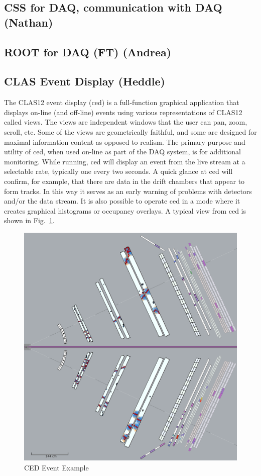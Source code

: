 \subsection{CSS for DAQ, communication with DAQ (Nathan)}



\subsection{ROOT for DAQ (FT) (Andrea)}




\subsection{CLAS Event Display (Heddle)}

The CLAS12 event display (ced) is a full-function graphical application that displays on-line (and off-line) events using various representations of CLAS12 called views. The views are independent windows that the user can pan, zoom, scroll, etc. Some of the views are geometrically faithful, and some are designed for maximal information content as opposed to realism. The primary purpose and utility of ced, when used on-line as part of the DAQ system, is for additional monitoring. While running, ced will display an event from the live stream at a selectable rate, typically one every two seconds. A quick glance at ced will confirm, for example, that there are data in the drift chambers that appear to form tracks. In this way it serves as an early warning of problems with detectors and/or the data stream. It is also possible to operate ced in a mode where it creates graphical histograms or occupancy overlays. A typical view from ced is shown in Fig.~\ref{fig:ced}.

\begin{figure}[hbt]
	\centering
	\includegraphics[width=1.0\columnwidth,keepaspectratio]{img/ced.png}
	\caption{CED Event Example}
	\label{fig:ced}
\end{figure}
